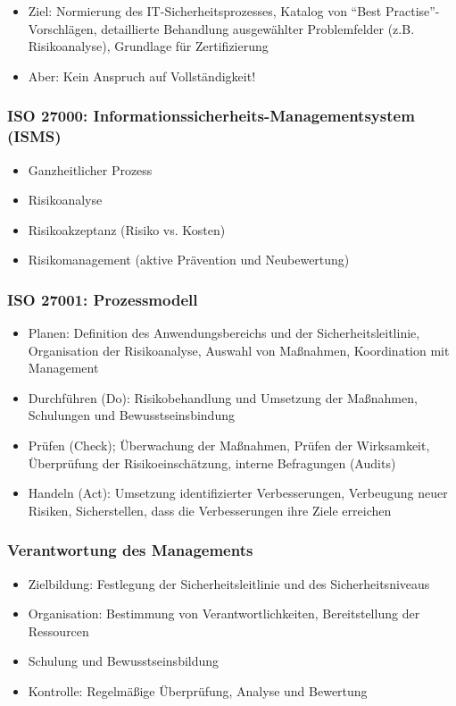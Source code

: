 \begin{itemize}
	\item Ziel: Normierung des IT-Sicherheitsprozesses, Katalog von "`Best Practise"'-Vorschlägen, detaillierte Behandlung ausgewählter Problemfelder (z.B. Risikoanalyse), Grundlage für Zertifizierung
	\item Aber: Kein Anspruch auf Vollständigkeit!
\end{itemize}

\subsubsection{ISO 27000: Informationssicherheits-Managementsystem (ISMS)}
\begin{itemize}
	\item Ganzheitlicher Prozess
	\item Risikoanalyse
	\item Risikoakzeptanz (Risiko vs. Kosten)
	\item Risikomanagement (aktive Prävention und Neubewertung)
\end{itemize}

\subsubsection{ISO 27001: Prozessmodell}
\begin{itemize}
	\item Planen: Definition des Anwendungsbereichs und der Sicherheitsleitlinie, Organisation der Risikoanalyse, Auswahl von Maßnahmen, Koordination mit Management
	\item Durchführen (Do): Risikobehandlung und Umsetzung der Maßnahmen, Schulungen und Bewusstseinsbindung
	\item Prüfen (Check); Überwachung der Maßnahmen, Prüfen der Wirksamkeit, Überprüfung der Risikoeinschätzung, interne Befragungen (Audits)
	\item Handeln (Act): Umsetzung identifizierter Verbesserungen, Verbeugung neuer Risiken, Sicherstellen, dass die Verbesserungen ihre Ziele erreichen
\end{itemize}

\subsubsection{Verantwortung des Managements}
\begin{itemize}
	\item Zielbildung: Festlegung der Sicherheitsleitlinie und des Sicherheitsniveaus
	\item Organisation: Bestimmung von Verantwortlichkeiten, Bereitstellung der Ressourcen
	\item Schulung und Bewusstseinsbildung
	\item Kontrolle: Regelmäßige Überprüfung, Analyse und Bewertung
\end{itemize}

